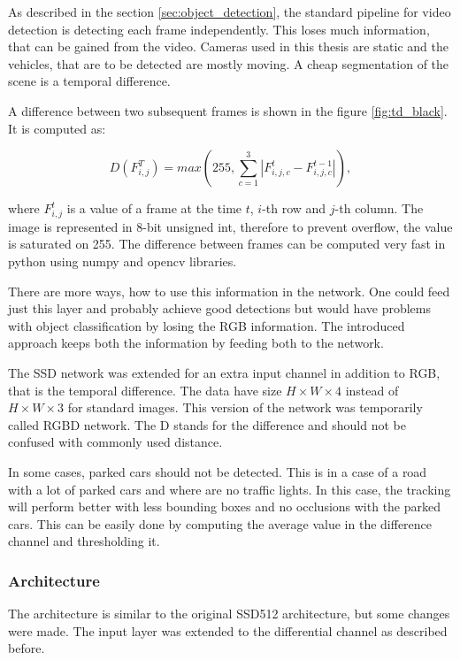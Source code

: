 \documentclass[a4paper,11pt,titlepage,twoside]{article}
\numberwithin{figure}{section}
\begin{document}
As described in the section \ref{sec:object_detection}, the standard pipeline for video detection is detecting each frame independently. This loses much information, that can be gained from the video. Cameras used in this thesis are static and the vehicles, that are to be detected are mostly moving. A cheap segmentation of the scene is a temporal difference. 

A difference between two subsequent frames is shown in the figure \ref{fig:td_black}. It is computed as:

\begin{equation}
D(F^{T}_{i, j}) = max(255, \sum_{c = 1}^3 |F^t_{i, j, c} - F^{t-1}_{i, j, c}|),
\end{equation}

where $F_{i, j}^t$ is a value of a frame at the time $t$, $i$-th row and $j$-th column. The image is represented in 8-bit unsigned int, therefore to prevent overflow, the value is saturated on 255. The difference between frames can be computed very fast in python using numpy\cite{walt2011numpy} and opencv\cite{opencv} libraries. 

There are more ways, how to use this information in the network. One could feed just this layer and probably achieve good detections but would have problems with object classification by losing the RGB information. The introduced approach keeps both the information by feeding both to the network.

The SSD network was extended for an extra input channel in addition to RGB, that is the temporal difference. The data have size $H \times W \times 4$ instead of $H \times W \times 3$ for standard images. This version of the network was temporarily called RGBD network. The D stands for the difference and should not be confused with commonly used distance.

In some cases, parked cars should not be detected. This is in a case of a road with a lot of parked cars and where are no traffic lights. In this case, the tracking will perform better with less bounding boxes and no occlusions with the parked cars. This can be easily done by computing the average value in the difference channel and thresholding it.


\clearpage
\subsubsection{Architecture}
The architecture is similar to the original SSD512 architecture, but some changes were made. The input layer was extended to the differential channel as described before. 
\end{document}
